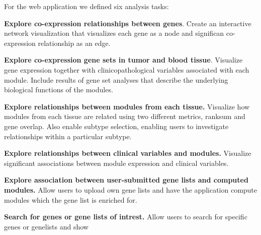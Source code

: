 For the web application we defined six analysis tasks: 

\textbf{Explore co-expression relationships between genes}. Create an
interactive network visualization that visualizes each gene as a node and
significan co-expression relationship as an edge. 

\textbf{Explore co-expression gene sets in tumor and blood tissue}.
Visualize gene expression together with clinicopathological variables associated
with each module. Include results of gene set analyses that describe the
underlying biological functions of the modules. 

\textbf{Explore relationships between modules from each tissue.}
Visualize how modules from each tissue are related using two different
metrics, ranksum and gene overlap. Also enable subtype selection,
enabling users to investigate relationships within a particular subtype. 

\textbf{Explore relationships between clinical variables and modules.}
Visualize significant associations between module expression and
clinical variables.

\textbf{Explore association between user-submitted gene lists and computed
modules.} Allow users to upload own gene lists and have the application compute
modules which the gene list is enriched for. 

\textbf{Search for genes or gene lists of intrest.} Allow users to search
for specific genes or genelists and show 

